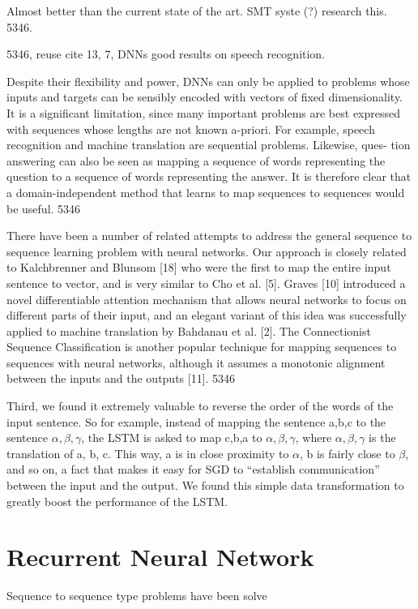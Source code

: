 Almost better than the current state of the art. SMT syste (?) research this. 5346.

5346, reuse cite 13, 7, DNNs good results on speech recognition.

Despite their flexibility and power, DNNs can only be applied to problems whose inputs and targets can be sensibly encoded with vectors of fixed dimensionality. It is a significant limitation, since many important problems are best expressed with sequences whose lengths are not known a-priori. For example, speech recognition and machine translation are sequential problems. Likewise, ques- tion answering can also be seen as mapping a sequence of words representing the question to a sequence of words representing the answer. It is therefore clear that a domain-independent method that learns to map sequences to sequences would be useful. 5346

There have been a number of related attempts to address the general sequence to sequence learning problem with neural networks. Our approach is closely related to Kalchbrenner and Blunsom [18] who were the first to map the entire input sentence to vector, and is very similar to Cho et al. [5]. Graves [10] introduced a novel differentiable attention mechanism that allows neural networks to focus on different parts of their input, and an elegant variant of this idea was successfully applied to machine translation by Bahdanau et al. [2]. The Connectionist Sequence Classification is another popular technique for mapping sequences to sequences with neural networks, although it assumes a monotonic alignment between the inputs and the outputs [11]. 5346

Third, we found it extremely valuable to reverse the order of the words of the input sentence. So for example, instead of mapping the sentence a,b,c to the sentence $\alpha, \beta, \gamma$, the LSTM is asked to map c,b,a to $\alpha, \beta, \gamma$, where $\alpha, \beta, \gamma$ is the translation of a, b, c. This way, a is in close proximity to $\alpha$, b is fairly close to $\beta$, and so on, a fact that makes it easy for SGD to “establish communication” between the input and the output. We found this simple data transformation to greatly boost the performance of the LSTM.


\section{Recurrent Neural Network}
Sequence to sequence type problems have been solve

